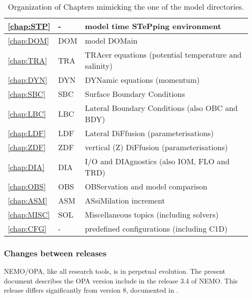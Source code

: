 \documentclass[../tex_main/NEMO_manual]{subfiles}
\begin{document}
\begin{table}[!t]	
  \caption{ \protect\label{tab:chap}   Organization of Chapters mimicking the one of the model directories. }
  \begin{center}
    \begin{tabular}{|l|l|l|}	\hline
      \autoref{chap:STP}	& -   		        & model time STePping environment \\		\hline
      \autoref{chap:DOM}	& DOM		& model DOMain \\		\hline
      \autoref{chap:TRA}	& TRA		& TRAcer equations (potential temperature and salinity) \\   \hline
      \autoref{chap:DYN}	& DYN		& DYNamic equations (momentum) \\		\hline
      \autoref{chap:SBC} 	& SBC		& Surface Boundary Conditions \\			\hline
      \autoref{chap:LBC}	& LBC		& Lateral Boundary Conditions (also OBC and BDY)  \\ 		\hline
      \autoref{chap:LDF}	& LDF		& Lateral DiFfusion (parameterisations) \\	\hline
      \autoref{chap:ZDF}	& ZDF		& vertical (Z) DiFfusion (parameterisations)  \\		\hline
      \autoref{chap:DIA}	& DIA		& I/O and DIAgnostics (also IOM, FLO and TRD) \\		\hline
      \autoref{chap:OBS}	& OBS		& OBServation and model comparison  \\		\hline
      \autoref{chap:ASM}	& ASM		& ASsiMilation increment  \\		\hline
      \autoref{chap:MISC}	& SOL		& Miscellaneous  topics (including solvers)  \\       \hline
      \autoref{chap:CFG}	&  - 			& predefined configurations (including C1D) \\		\hline
    \end{tabular}
  \end{center}
\end{table}


\subsubsection{Changes between releases}
NEMO/OPA, like all research tools, is in perpetual evolution.
The present document describes the OPA version include in the release 3.4 of NEMO.
This release differs significantly from version 8, documented in \citet{Madec1998}.\\
\end{document}
